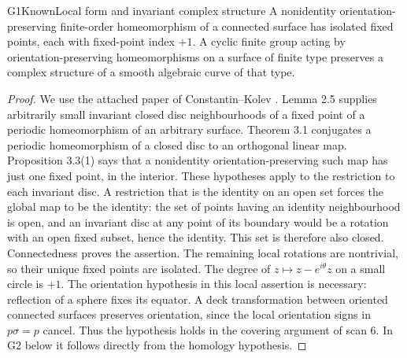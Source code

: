\begin{result}{G1}{Known}{Local form and invariant complex structure}
A nonidentity orientation-preserving finite-order homeomorphism of a
connected surface has isolated fixed points, each with fixed-point index
$+1$. A cyclic finite group acting by orientation-preserving homeomorphisms
on a surface of finite type preserves a complex structure of a smooth
algebraic curve of that type.
\end{result}
\begin{proof}
We use the attached paper of Constantin--Kolev
\cite[Lemma 2.5; Theorem 3.1; Proposition 3.3(1)]{G_ConstantinKolev}.
Lemma 2.5 supplies arbitrarily small invariant closed disc neighbourhoods
of a fixed point of a periodic homeomorphism of an arbitrary surface.
Theorem 3.1 conjugates a periodic homeomorphism of a closed disc to an
orthogonal linear map. Proposition 3.3(1) says that a nonidentity
orientation-preserving such map has just one fixed point, in the interior.
These hypotheses apply to the restriction to each invariant disc. A
restriction that is the identity on an open set forces the global map to
be the identity: the set of points having an identity neighbourhood is
open, and an invariant disc at any point of its boundary would be a
rotation with an open fixed subset, hence the identity. This set is
therefore also closed. Connectedness proves the assertion. The remaining
local rotations are nontrivial, so their unique fixed points are isolated.
The degree of $z\mapsto z-e^{i\theta}z$ on a small circle is $+1$.
The orientation hypothesis in this local assertion is necessary:
reflection of a sphere fixes its equator. A deck transformation between
oriented connected surfaces preserves orientation, since the local
orientation signs in $p\sigma=p$ cancel. Thus the hypothesis holds in
the covering argument of scan 6. In G2 below it follows directly from
the homology hypothesis.


\end{proof}
